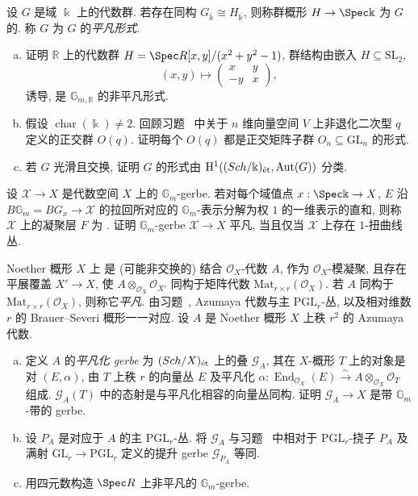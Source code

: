 \begin{exercise}[群概形的形式]\label{src:7.4.48}
设 $G$ 是域 $\Bbbk$ 上的代数群. 若存在同构 $G_{\overline{\Bbbk}}\cong H_{\overline{\Bbbk}}$, 则称群概形 $H\to\Spec\Bbbk$ 为 $G$ 的. 称 $G$ 为 $G$ 的\emph{平凡形式}.
\begin{enumerate}[(a)]
\item 证明 $\mathbb R$ 上的代数群 $H=\Spec\mathbb R[x,y]/(x^2+y^2-1)$, 群结构由嵌入 $H\subseteq\mathrm{SL}_2$,
\[
(x,y)\longmapsto\begin{pmatrix}x&y\\-y&x\end{pmatrix},
\]
诱导, 是 $\mathbb G_{m,\mathbb R}$ 的非平凡形式.
\item 假设 $\operatorname{char}(\Bbbk)\neq2$. 回顾习题~ 中关于 $n$ 维向量空间 $V$ 上非退化二次型 $q$ 定义的正交群 $O(q)$. 证明每个 $O(q)$ 都是正交矩阵子群 $O_n\subseteq\mathrm{GL}_n$ 的形式.
\item 若 $G$ 光滑且交换, 证明 $G$ 的形式由 $\mathrm H^1((Sch/\Bbbk)_{\text{ét}},\operatorname{Aut}(G))$ 分类.
\end{enumerate}
\end{exercise}
\begin{exercise}\label{src:7.4.49}
设 $\mathcal X\to X$ 是代数空间 $X$ 上的 $\mathbb G_m$-gerbe. 若对每个域值点 $x:\Spec\Bbbk\to\mathcal X$, $E$ 沿 $B\mathbb G_m=BG_x\to\mathcal X$ 的拉回所对应的 $\mathbb G_m$-表示分解为权 $1$ 的一维表示的直和, 则称 $\mathcal X$ 上的凝聚层 $F$ 为 . 证明 $\mathbb G_m$-gerbe $\mathcal X\to X$ 平凡, 当且仅当 $\mathcal X$ 上存在 $1$-扭曲线丛.
\end{exercise}
\begin{exercise}[Azumaya 代数]\label{src:7.4.50}
Noether 概形 $X$ 上 是 (可能非交换的) 结合 $\mathcal O_X$-代数 $A$, 作为 $\mathcal O_X$-模凝聚, 且存在平展覆盖 $X'\to X$, 使 $A\otimes_{\mathcal O_X}\mathcal O_{X'}$ 同构于矩阵代数 $\mathrm{Mat}_{r\times r}(\mathcal O_X)$. 若 $A$ 同构于 $\mathrm{Mat}_{r\times r}(\mathcal O_X)$, 则称它\emph{平凡}. 由习题~, Azumaya 代数与主 $\mathrm{PGL}_r$-丛, 以及相对维数 $r$ 的 Brauer--Severi 概形一一对应. 设 $A$ 是 Noether 概形 $X$ 上秩 $r^2$ 的 Azumaya 代数.
\begin{enumerate}[(a)]
\item 定义 $A$ 的\emph{平凡化 gerbe} 为 $(Sch/X)_{\text{ét}}$ 上的叠 $\mathcal G_A$, 其在 $X$-概形 $T$ 上的对象是对 $(E,\alpha)$, 由 $T$ 上秩 $r$ 的向量丛 $E$ 及平凡化 $\alpha:\operatorname{End}_{\mathcal O_X}(E)\xrightarrow{\sim}A\otimes_{\mathcal O_X}\mathcal O_T$ 组成. $\mathcal G_A(T)$ 中的态射是与平凡化相容的向量丛同构. 证明 $\mathcal G_A\to X$ 是带 $\mathbb G_m$-带的 gerbe.
\item 设 $P_A$ 是对应于 $A$ 的主 $\mathrm{PGL}_r$-丛. 将 $\mathcal G_A$ 与习题~ 中相对于 $\mathrm{PGL}_r$-挠子 $P_A$ 及满射 $\mathrm{GL}_r\to\mathrm{PGL}_r$ 定义的提升 gerbe $\mathcal G_{P_A}$ 等同.
\item 用四元数构造 $\Spec\mathbb R$ 上非平凡的 $\mathbb G_m$-gerbe.
\end{enumerate}
\end{exercise}
